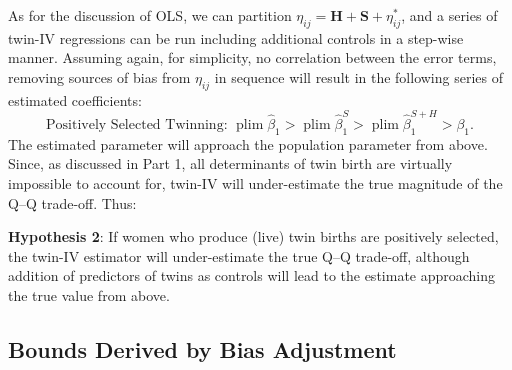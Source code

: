 \documentclass[subeqn]{article}
\DeclareMathOperator{\plim}{plim}
\begin{document}
\begin{spacing}{1.4}
As for the discussion of OLS, we can partition $\eta_{ij}=\bm{H}+\bm{S}+\eta^*_{ij}$, and a series of twin-IV regressions
can be run including additional controls in a step-wise manner. Assuming again, for simplicity, no correlation between the error terms, removing sources
of bias from $\eta_{ij}$ in sequence will result in the following series of estimated coefficients:
\begin{equation}
  \text{Positively Selected Twinning:\ \ \ } \plim \hat\beta_1 > \plim\hat\beta_1^{S} > \plim\hat\beta_1^{S+H} > \beta_1. \nonumber
\end{equation}
The estimated parameter will approach the population parameter from above. Since, as discussed in Part 1, all determinants of twin birth are virtually impossible to account for, twin-IV will under-estimate the true magnitude of the Q--Q trade-off. Thus:

\noindent \textbf{Hypothesis 2}: If women who produce (live) twin births are
positively selected, the twin-IV estimator will under-estimate the true Q--Q trade-off, although addition of predictors of twins as controls will lead to the estimate approaching the true value from above.

\subsection{Bounds Derived by Bias Adjustment}


\end{spacing}
\end{document}
